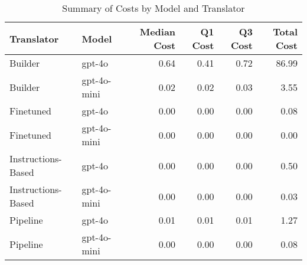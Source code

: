 \begin{table}
    \caption{Summary of Costs by Model and Translator}
    \label{tab:cost_summary}
    \begin{tabular}{llrrrr}
    \toprule
    Translator & Model & Median Cost & Q1 Cost & Q3 Cost & Total Cost \\
    \midrule
    Builder & gpt-4o & 0.64 & 0.41 & 0.72 & 86.99 \\
    Builder & gpt-4o-mini & 0.02 & 0.02 & 0.03 & 3.55 \\
    Finetuned & gpt-4o & 0.00 & 0.00 & 0.00 & 0.08 \\
    Finetuned & gpt-4o-mini & 0.00 & 0.00 & 0.00 & 0.00 \\
    Instructions-Based & gpt-4o & 0.00 & 0.00 & 0.00 & 0.50 \\
    Instructions-Based & gpt-4o-mini & 0.00 & 0.00 & 0.00 & 0.03 \\
    Pipeline & gpt-4o & 0.01 & 0.01 & 0.01 & 1.27 \\
    Pipeline & gpt-4o-mini & 0.00 & 0.00 & 0.00 & 0.08 \\
    \bottomrule
    \end{tabular}
\end{table}
    